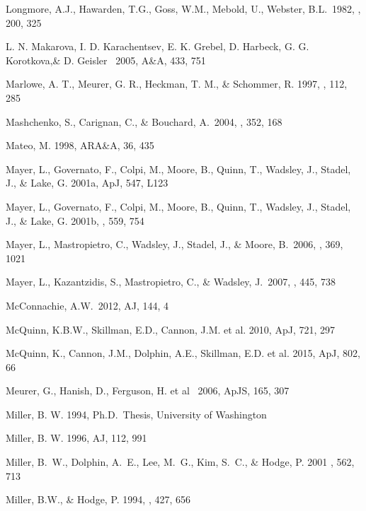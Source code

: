 \documentclass[12pt,preprint]{emulateapj}
\begin{document}
\begin{thebibliography}{}
Longmore, A.J., Hawarden, T.G., Goss, W.M., Mebold, U., Webster, B.L.\ 1982, \mnras, 200, 325

L. N. Makarova, I. D. Karachentsev, E. K. Grebel, D. Harbeck, G. G. Korotkova,\&
D. Geisler \ 2005, A\&A, 433, 751

Marlowe, A. T., Meurer, G. R., Heckman, T. M., \& Schommer, R. 1997, 
\apjs , 112, 285

Mashchenko, S., Carignan, C., \& Bouchard, A.\ 2004, \mnras, 352, 168 

Mateo, M. 1998, ARA\&A, 36, 435

Mayer, L., Governato, F., Colpi, M., Moore, B., Quinn, T., Wadsley, J., 
Stadel, J., \& Lake, G. 2001a, ApJ, 547, L123

Mayer, L., Governato, F., Colpi, M., Moore, B., Quinn, T., Wadsley, J., 
Stadel, J., \& Lake, G. 2001b, \apj, 559, 754 

Mayer, L., Mastropietro, C., Wadsley, J., Stadel, J., \& 
   Moore, B.\ 2006, \mnras, 369, 1021

Mayer, L., Kazantzidis, S., Mastropietro, C., \& Wadsley, J.\ 2007, \nat, 445, 738 

McConnachie, A.W.\ 2012, AJ, 144, 4 

McQuinn, K.B.W., Skillman, E.D., Cannon, J.M. et al. 2010, ApJ, 721, 297 

McQuinn, K., Cannon, J.M., Dolphin, A.E., Skillman, E.D. et al. 2015, ApJ, 802, 66 

Meurer, G., Hanish, D., Ferguson, H. et al \ 2006, ApJS, 165, 307 

Miller, B. W. 1994, Ph.D.\ Thesis, University of Washington

Miller, B. W. 1996, AJ, 112, 991 

Miller, B.~W., Dolphin, A.~E., Lee, M.~G., Kim, S.~C., \& Hodge, P. 2001
\apj , 562, 713

Miller, B.W., \& Hodge, P. 1994, \apj , 427, 656


\end{thebibliography}
\end{document}

